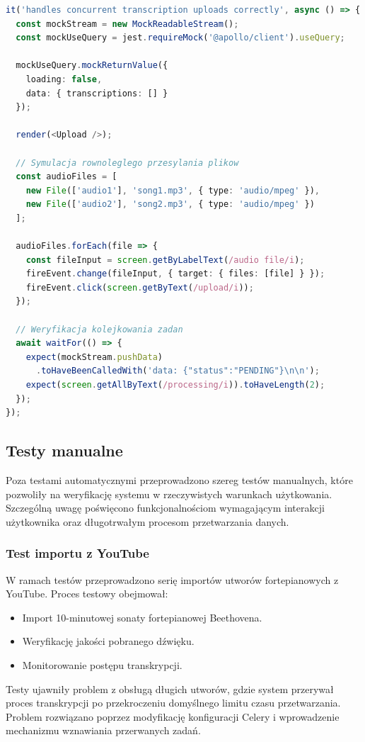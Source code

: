 \documentclass[a4paper,twoside,12pt]{book}
\begin{document}
\begin{lstlisting}[float, language=typescript, caption={Test endpointu transkrypcji}, label={lst:transcription-endpoint}]
it('handles concurrent transcription uploads correctly', async () => {
  const mockStream = new MockReadableStream();
  const mockUseQuery = jest.requireMock('@apollo/client').useQuery;
  
  mockUseQuery.mockReturnValue({
    loading: false, 
    data: { transcriptions: [] }
  });

  render(<Upload />);
  
  // Symulacja rownoleglego przesylania plikow
  const audioFiles = [
    new File(['audio1'], 'song1.mp3', { type: 'audio/mpeg' }),
    new File(['audio2'], 'song2.mp3', { type: 'audio/mpeg' })
  ];

  audioFiles.forEach(file => {
    const fileInput = screen.getByLabelText(/audio file/i);
    fireEvent.change(fileInput, { target: { files: [file] } });
    fireEvent.click(screen.getByText(/upload/i));
  });

  // Weryfikacja kolejkowania zadan
  await waitFor(() => {
    expect(mockStream.pushData)
      .toHaveBeenCalledWith('data: {"status":"PENDING"}\n\n');
    expect(screen.getAllByText(/processing/i)).toHaveLength(2);
  });
});
\end{lstlisting}

\subsection{Testy manualne}
Poza testami automatycznymi przeprowadzono szereg testów manualnych, które pozwoliły na weryfikację systemu w rzeczywistych warunkach użytkowania. Szczególną uwagę poświęcono funkcjonalnościom wymagającym interakcji użytkownika oraz długotrwałym procesom przetwarzania danych.

\subsubsection{Test importu z YouTube}
W ramach testów przeprowadzono serię importów utworów fortepianowych z YouTube. Proces testowy obejmował:
\begin{itemize}
\item Import 10-minutowej sonaty fortepianowej Beethovena.
\item Weryfikację jakości pobranego dźwięku.
\item Monitorowanie postępu transkrypcji.
\end{itemize}
Testy ujawniły problem z obsługą długich utworów, gdzie system przerywał proces transkrypcji po przekroczeniu domyślnego limitu czasu przetwarzania. Problem rozwiązano poprzez modyfikację konfiguracji Celery i wprowadzenie mechanizmu wznawiania przerwanych zadań.
\end{document}
